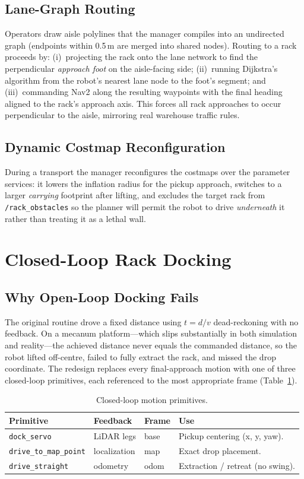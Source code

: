 \documentclass[11pt,a4paper]{article}
\newcommand{\code}[1]{\texttt{\small #1}}
\begin{document}
\subsection{Lane-Graph Routing}
Operators draw aisle polylines that the manager compiles into an undirected
graph (endpoints within 0.5\,m are merged into shared nodes). Routing to a
rack proceeds by: (i)~projecting the rack onto the lane network to find the
perpendicular \emph{approach foot} on the aisle-facing side; (ii)~running
Dijkstra's algorithm from the robot's nearest lane node to the foot's
segment; and (iii)~commanding Nav2 along the resulting waypoints with the
final heading aligned to the rack's approach axis. This forces all rack
approaches to occur perpendicular to the aisle, mirroring real warehouse
traffic rules.

\subsection{Dynamic Costmap Reconfiguration}
During a transport the manager reconfigures the costmaps over the parameter
services: it lowers the inflation radius for the pickup approach, switches to
a larger \emph{carrying} footprint after lifting, and excludes the target
rack from \code{/rack\_obstacles} so the planner will permit the robot to
drive \emph{underneath} it rather than treating it as a lethal wall.

\section{Closed-Loop Rack Docking}\label{sec:dock}
\subsection{Why Open-Loop Docking Fails}
The original routine drove a fixed distance using
$t = d / v$ dead-reckoning with no feedback. On a mecanum platform---which
slips substantially in both simulation and reality---the achieved distance
never equals the commanded distance, so the robot lifted off-centre, failed
to fully extract the rack, and missed the drop coordinate. The redesign
replaces every final-approach motion with one of three closed-loop
primitives, each referenced to the most appropriate frame
(Table~\ref{tab:prims}).

\begin{table}[h]\centering\small
\caption{Closed-loop motion primitives.}\label{tab:prims}
\begin{tabular}{@{}lll p{5.2cm}@{}}
\toprule
\textbf{Primitive} & \textbf{Feedback} & \textbf{Frame} & \textbf{Use}\\
\midrule
\code{dock\_servo} & LiDAR legs & base & Pickup centering (x, y, yaw).\\
\code{drive\_to\_map\_point} & localization & map & Exact drop placement.\\
\code{drive\_straight} & odometry & odom & Extraction / retreat (no swing).\\
\bottomrule
\end{tabular}
\end{table}
\end{document}
